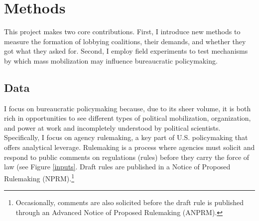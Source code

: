 

\section{Methods}
This project makes two core contributions. First, I introduce new methods to 
measure the formation of lobbying coalitions, their demands, and whether they got what they asked for. 
Second, I employ field experiments to test mechanisms by which mass mobilization may influence bureaucratic policymaking. 






\subsection{Data}
I focus on bureaucratic policymaking because, due to its sheer volume, it is both rich in opportunities to see different types of political mobilization, organization, and power at work and incompletely understood by political scientists. Specifically, I focus on agency rulemaking, a key part of U.S. policymaking that offers analytical leverage. Rulemaking is a process where agencies must solicit and respond to public comments on regulations (rules) before they carry the force of law (see Figure \ref{inputs}. Draft rules are published in a Notice of Proposed Rulemaking (NPRM).\footnote{Occasionally, comments are also solicited before the draft rule is published through an Advanced Notice of Proposed Rulemaking (ANPRM).} %

